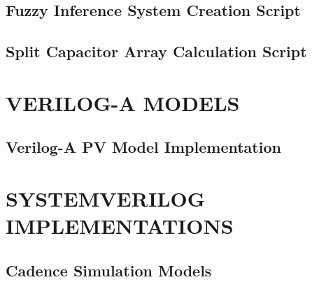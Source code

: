 \documentclass[a4paper,oneside,12pt]{report}
\numberwithin{equation}{chapter}
\begin{document}
\section{Fuzzy Inference System Creation Script}


\section{Split Capacitor Array Calculation Script}


\chapter{VERILOG-A MODELS}\label{app:veriloga}

\section{Verilog-A PV Model Implementation}


\chapter{SYSTEMVERILOG IMPLEMENTATIONS}\label{app:systemverilog}
\section{Cadence Simulation Models}




\end{document}
